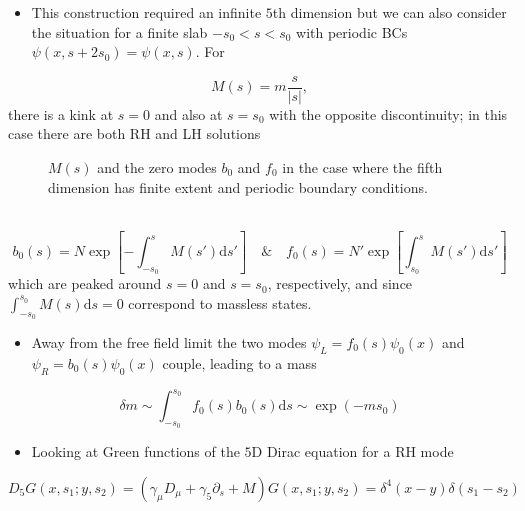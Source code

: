 \begin{itemize}
    \item This construction required an infinite $5$th dimension but we can also consider the situation for a finite slab $-s_0 < s < s_0$ with periodic BCs $\psi(x, s+2s_0) = \psi(x,s)$. For
\end{itemize}
\begin{equation}
    M(s) = m\frac{s}{|s|},
\end{equation}
there is a kink at $s=0$ and also at $s=s_0$ with the opposite discontinuity; in this case there are both RH and LH solutions
\begin{figure}
\caption{$M(s)$ and the zero modes $b_0$ and $f_0$ in the case where the fifth dimension has finite extent and periodic boundary conditions.}
\end{figure}\\
\begin{equation}
    b_0(s) = N \exp{[-\int_{-s_0}^s M(s')\text{d}s']}\quad \& \quad f_0(s) = N' \exp{[\int_{s_0}^s M(s')\text{d}s']}
\end{equation}
which are peaked around $s=0$ and $s=s_0$, respectively, and since $\int_{-s_0}^{s_0}M(s) \text{d}s = 0$ correspond to massless states.
\begin{itemize}
    \item Away from the free field limit the two modes $\psi_L = f_0(s) \psi_0(x)$ and $\psi_R = b_0(s)\psi_0(x)$ couple, leading to a mass
\end{itemize}
\begin{equation}
    \delta m \sim \int_{-s_0}^{s_0}f_0(s)b_0(s)\text{d}s \sim \exp{(-m s_0)}
\end{equation}
\begin{itemize}
    \item Looking at Green functions of the $5$D Dirac equation for a RH mode
\end{itemize}

\begin{equation}
D_{5} G\left(x, s_{1} ; y, s_{2}\right)=\left(\gamma_\mu D_{\mu}+\gamma_{5} \partial_{s}+M\right) G\left(x, s_{1} ; y, s_{2}\right)=\delta^{4}(x-y) \delta\left(s_{1}-s_{2}\right)
\end{equation}

